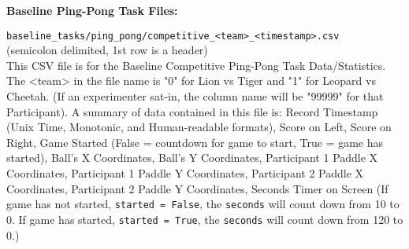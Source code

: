 \begin{description}
\bigskip\item\textbf{Baseline Ping-Pong Task Files:}
\medskip
\item\verb|baseline_tasks/ping_pong/competitive_<team>_<timestamp>.csv|\\
    (semicolon delimited, 1st row is a header)\\
    This CSV file is for the Baseline Competitive Ping-Pong Task
    Data/Statistics. The <team> in the file name is "0" for Lion vs Tiger and
    "1" for Leopard vs Cheetah. (If an experimenter sat-in, the column name
    will be "99999" for that Participant). A summary of data contained in this
    file is: Record Timestamp (Unix Time, Monotonic, and Human-readable
    formats), Score on Left, Score on Right, Game Started (False = countdown
    for game to start, True = game has started), Ball's X Coordinates, Ball's Y
    Coordinates, Participant 1 Paddle X Coordinates, Participant 1 Paddle Y
    Coordinates, Participant 2 Paddle X Coordinates, Participant 2 Paddle Y
    Coordinates, Seconds Timer on Screen (If game has not started,
    \verb|started = False|, the \verb|seconds| will count down from 10 to 0. If
    game has started, \verb|started = True|, the \verb|seconds| will count down
    from 120 to 0.)


\end{description}

